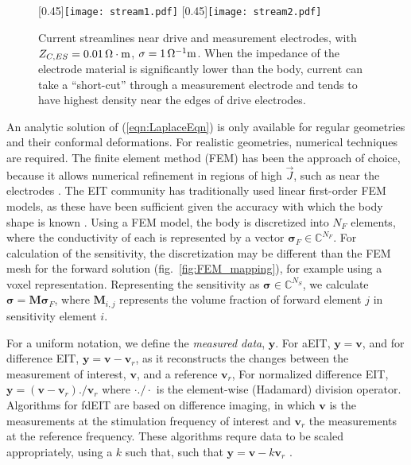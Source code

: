 \documentclass[10pt,journal]{IEEEtran}\def\TBLWIDA{15mm}\def\TBLWIDB{60mm}
\newcommand\fref[1]{fig.\ \ref{#1}}
\newcommand{\yB}{\mathbf{y}}
\newcommand{\vB}{\mathbf{v}}
\newcommand{\MB}{\mathbf{M}}
\newcommand{\sG}{\bm{\sigma}}
\begin{document}
\begin{figure}
\centering
   [0.45\columnwidth]{\texttt{[image: stream1.pdf]}}\hfil
   [0.45\columnwidth]{\texttt{[image: stream2.pdf]}}\\
\caption{%
Current streamlines near drive and measurement electrodes, with
$Z_{C,ES} = 0.01\,\Omega\cdot{\rm m}$, $\sigma=1\,\Omega^{-1}{\rm m}$. When the
impedance of the electrode material is significantly lower than the 
body, current can take a ``short-cut'' through a measurement electrode 
and tends to have highest density near the edges of drive electrodes.
}
\label{fig:electrode_currents}
\end{figure}


An analytic solution of (\ref{eqn:LaplaceEqn}) is only available for
regular geometries and their conformal deformations. For realistic
geometries, numerical techniques are required. The finite element
method (FEM) has been the approach of choice, because it allows
numerical refinement in regions of high $\vec{J}$, such as
near the electrodes \cite{Grychtol2013Refinement}. The EIT community
has traditionally used linear first-order FEM models, as these
have been sufficient given the accuracy with which
the body shape is known \cite{Grychtol2012Mismatch}.
Using a FEM model, the body is discretized into $N_F$ elements,
where the conductivity of each is represented by a vector
$\sG_F \in \mathbb{C}^{N_F}$.
For calculation of the sensitivity, the discretization may
be different than the FEM mesh for the forward solution (\fref{fig:FEM_mapping}),
 for example using a voxel representation.
Representing the sensitivity as $\sG \in \mathbb{C}^{N_S}$, 
we calculate $\sG = \MB \sG_F$, where $\MB_{i,j}$
represents the volume fraction of forward element $j$ in
sensitivity element $i$.

For a uniform notation, we define the {\em measured data}, $\yB$.
For aEIT, $\yB = \vB$, and for
difference EIT, $\yB= \vB - \vB_r$, as it reconstructs
the changes 
between the measurement of interest, $\vB$, and a reference $\vB_r$,
For normalized difference EIT, $\yB= (\vB - \vB_r) ./ \vB_r$
where $\cdot ./ \cdot$ is the element-wise (Hadamard) division operator.
Algorithms for fdEIT are based on difference imaging, in which
$\vB$ is the measurements at the stimulation frequency of
interest and
$\vB_r$ the measurements at the reference frequency. 
These algorithms requre data to be scaled appropriately,
using a $k$ such that,
such that $\yB= \vB - k \vB_r$ \cite{Seo2008fdEIT}.
\end{document}
